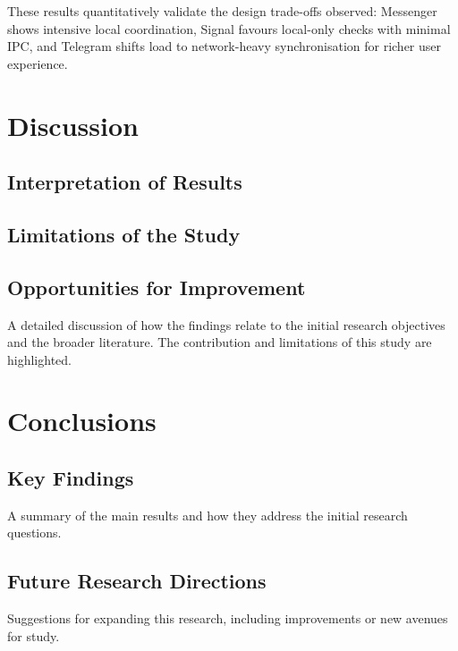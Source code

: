 \documentclass[a4paper,12pt]{report}
\begin{document}
These results quantitatively validate the design trade-offs observed: Messenger shows intensive local coordination, Signal favours local-only checks with minimal IPC, and Telegram shifts load to network-heavy synchronisation for richer user experience.

\chapter{Discussion}

\section{Interpretation of Results}

\section{Limitations of the Study}

\section{Opportunities for Improvement}


A detailed discussion of how the findings relate to the initial research objectives and the broader literature. The contribution and limitations of this study are highlighted.

\chapter{Conclusions}

\section{Key Findings}
A summary of the main results and how they address the initial research questions.

\section{Future Research Directions}
Suggestions for expanding this research, including improvements or new avenues for study.
\end{document}
